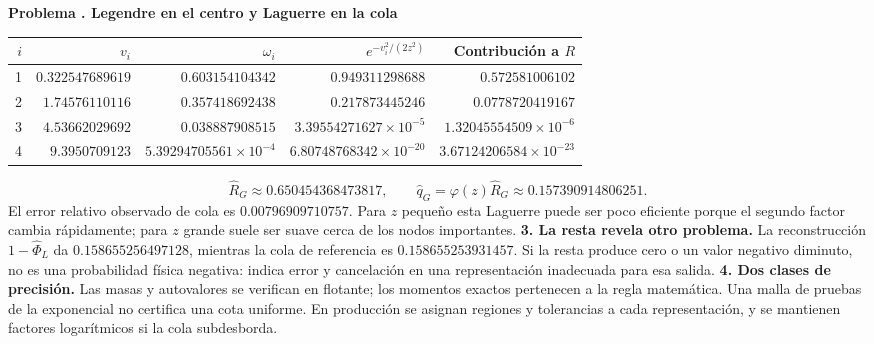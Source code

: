 \documentclass[11pt,a4paper]{article}
\theoremstyle{definition}
\newcounter{problema}
\newenvironment{resuelto}[1]{\refstepcounter{problema}\par\medskip\Needspace{6\baselineskip}\textbf{Problema \theproblema. #1}\par}{\par\medskip}
\begin{document}
\begin{resuelto}{Legendre en el centro y Laguerre en la cola}
\begin{center}\small\begin{tabular}{rrrrr}
\toprule
$i$&$v_i$&$\omega_i$&$e^{-v_i^2/(2z^2)}$&Contribución a $R$\\
\midrule
1&$0.322547689619$&$0.603154104342$&$0.949311298688$&$0.572581006102$\\
2&$1.74576110116$&$0.357418692438$&$0.217873445246$&$0.0778720419167$\\
3&$4.53662029692$&$0.038887908515$&$3.39554271627\times10^{-5}$&$1.32045554509\times10^{-6}$\\
4&$9.3950709123$&$5.39294705561\times10^{-4}$&$6.80748768342\times10^{-20}$&$3.67124206584\times10^{-23}$\\
\bottomrule\end{tabular}\end{center}
\[
\widehat R_G\approx0.650454368473817,\qquad
\widehat q_G=\varphi(z)\widehat R_G\approx0.157390914806251.
\]
El error relativo observado de cola es $0.00796909710757$. Para $z$ pequeño esta Laguerre puede ser poco eficiente porque el segundo factor cambia rápidamente; para $z$ grande suele ser suave cerca de los nodos importantes.
\textbf{3. La resta revela otro problema.} La reconstrucción $1-\widehat\Phi_L$ da $0.158655256497128$, mientras la cola de referencia es $0.158655253931457$. Si la resta produce cero o un valor negativo diminuto, no es una probabilidad física negativa: indica error y cancelación en una representación inadecuada para esa salida.
\textbf{4. Dos clases de precisión.} Las masas y autovalores se verifican en flotante; los momentos exactos pertenecen a la regla matemática. Una malla de pruebas de la exponencial no certifica una cota uniforme. En producción se asignan regiones y tolerancias a cada representación, y se mantienen factores logarítmicos si la cola subdesborda.
\end{resuelto}
\end{document}
